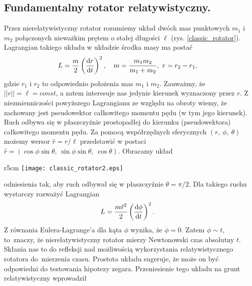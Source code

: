 \subsection{Fundamentalny rotator relatywistyczny.}
Przez nierelatywistyczny rotator rozumiemy układ dwóch mas punktowych
$m_1$ i $m_2$ połączonych nieważkim
prętem o stałej długości $\ell$ (rys. \ref{classic_rotator}). Lagrangian 
takiego układu w układzie środka masy ma postać~\cite{landau1978krotki}
\begin{align*}
L = \frac{m }{2} \left(\frac{\text{d} r}{\text{d} t}\right)^2, 
\quad m=\frac{m_1 m_2}{m_1+m_2},\ r=r_2-r_1,
\end{align*}
gdzie $r_1$ i $r_2$ to odpowiednio położenia mas $m_1$ i $m_2$.
Zauważmy, że $||r|| =\ell = const$, a zatem interesuje nas jedynie kierunek 
wyznaczony przez $r$.
Z niezmienniczości powyższego Lagrangianu ze względu na obroty wiemy, że
 zachowany jest pseudowektor całkowitego
momentu pędu (w tym jego kierunek). Ruch
odbywa się w płaszczyźnie 
prostopadłej do kierunku (pseudowektora) całkowitego 
momentu pędu.
 Za pomocą  współrzędnych sferycznych $(r,\ \phi,\ \theta)$ 
możemy wersor $ \hat{r} = r / \ell$  przedstawić w postaci
 $\hat{r} = ( \cos \phi \sin\theta, \ \sin\phi\sin\theta,\ \cos\theta )$.
Obracamy układ 
\begin{wrapfigure}[8]{r}{5cm}
\centering
\texttt{[image: classic\_rotator2.eps]}
\caption{Klasyczny rotator.
}
\label{classic_rotator}
\end{wrapfigure}
odniesienia tak, aby ruch odbywał się w
 płaszczyźnie $\theta = \pi/2$. 
Dla takiego ruchu wystarczy rozważyć Lagrangian 
\begin{align*}
L = \frac{m\ell^2 }{2} \left(\frac{\text{d} \phi}{\text{d} t}\right)^2.
\end{align*}
Z równania Eulera-Lagrange'a dla kąta $\phi$ wynika, że 
$\ddot{\phi} = 0.$
Zatem $\phi \sim t$, to~znaczy, że
nierelatywistyczny rotator mierzy Newtonowski czas
absolutny $t$. Skłania nas to do refleksji nad możliwością 
wykorzystania relatywistycznego rotatora 
do~mierzenia czasu. Prostota układu sugeruje, że 
może on być odpowiedni do testowania hipotezy zegara.
Przeniesienie tego układu na grunt relatywistyczny wprowadził 
